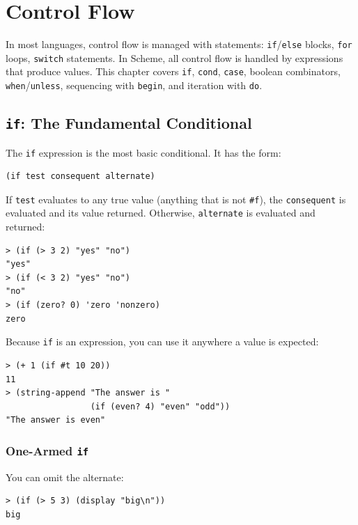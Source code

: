 \chapter{Control Flow}
\label{ch:control-flow}

In most languages, control flow is managed with statements: \texttt{if}/\texttt{else} blocks, \texttt{for} loops, \texttt{switch} statements. In Scheme, all control flow is handled by expressions that produce values. This chapter covers \texttt{if}, \texttt{cond}, \texttt{case}, boolean combinators, \texttt{when}/\texttt{unless}, sequencing with \texttt{begin}, and iteration with \texttt{do}.

\section{\texttt{if}: The Fundamental Conditional}

The \texttt{if} expression is the most basic conditional. It has the form:

\begin{lstlisting}
(if test consequent alternate)
\end{lstlisting}

If \texttt{test} evaluates to any true value (anything that is not \texttt{\#f}), the \texttt{consequent} is evaluated and its value returned. Otherwise, \texttt{alternate} is evaluated and returned:

\begin{lstlisting}[style=repl]
> (if (> 3 2) "yes" "no")
"yes"
> (if (< 3 2) "yes" "no")
"no"
> (if (zero? 0) 'zero 'nonzero)
zero
\end{lstlisting}

Because \texttt{if} is an expression, you can use it anywhere a value is expected:

\begin{lstlisting}[style=repl]
> (+ 1 (if #t 10 20))
11
> (string-append "The answer is "
                 (if (even? 4) "even" "odd"))
"The answer is even"
\end{lstlisting}

\subsection{One-Armed \texttt{if}}

You can omit the alternate:

\begin{lstlisting}[style=repl]
> (if (> 5 3) (display "big\n"))
big
\end{lstlisting}

